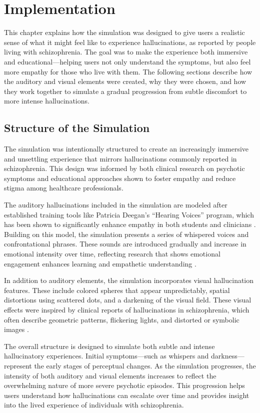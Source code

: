 \chapter{Implementation}
\label{ch:implementation}

This chapter explains how the simulation was designed to give users a realistic sense of what it might feel like to experience hallucinations, as reported by people living with schizophrenia. The goal was to make the experience both immersive and educational—helping users not only understand the symptoms, but also feel more empathy for those who live with them. The following sections describe how the auditory and visual elements were created, why they were chosen, and how they work together to simulate a gradual progression from subtle discomfort to more intense hallucinations.

\section{Structure of the Simulation}

The simulation was intentionally structured to create an increasingly immersive and unsettling experience that mirrors hallucinations commonly reported in schizophrenia. This design was informed by both clinical research on psychotic symptoms and educational approaches shown to foster empathy and reduce stigma among healthcare professionals.

The auditory hallucinations included in the simulation are modeled after established training tools like Patricia Deegan’s “Hearing Voices” program, which has been shown to significantly enhance empathy in both students and clinicians \cite{Hsia2022}. Building on this model, the simulation presents a series of whispered voices and confrontational phrases. These sounds are introduced gradually and increase in emotional intensity over time, reflecting research that shows emotional engagement enhances learning and empathetic understanding \cite{Skoy2016}.

In addition to auditory elements, the simulation incorporates visual hallucination features. These include colored spheres that appear unpredictably, spatial distortions using scattered dots, and a darkening of the visual field. These visual effects were inspired by clinical reports of hallucinations in schizophrenia, which often describe geometric patterns, flickering lights, and distorted or symbolic images \cite{Silverstein2021,Vanommen2019}.

The overall structure is designed to simulate both subtle and intense hallucinatory experiences. Initial symptoms—such as whispers and darkness—represent the early stages of perceptual changes. As the simulation progresses, the intensity of both auditory and visual elements increases to reflect the overwhelming nature of more severe psychotic episodes. This progression helps users understand how hallucinations can escalate over time and provides insight into the lived experience of individuals with schizophrenia.


